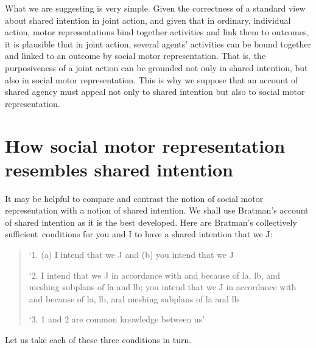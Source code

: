 \documentclass[12pt,\papersize]{extarticle}
\begin{document}


What we are suggesting is very simple.
Given the correctness of a standard view about shared intention in joint action, 
and 
given that in ordinary, individual action, motor representations  bind together activities and link them to outcomes,
it is plausible that 
in joint action, several agents' activities can be bound together and linked to an outcome by social motor representation.
That is,
the purposiveness of a joint action can be grounded not only in shared intention, but also in social motor representation.
This is why we suppose that an account of shared agency must appeal not only to shared intention but also to social motor representation.


\section{How social motor representation resembles shared intention}
It may be helpful to compare and contrast the notion of social motor representation with a notion of shared intention. 
We shall use Bratman's account of shared intention as it is the best developed. 
Here are Bratman’s collectively sufficient\footnotemark \ conditions for you and I to have a shared intention that we J:
%
%
\begin{quote}
\label{quote:bratman_account}
`1. (a) I intend that we J and (b) you intend that we J
 
`2. I intend that we J in accordance with and because of la, lb, and meshing subplans of la and lb; you intend that we J in accordance with and because of la, lb, and meshing subplans of la and lb
 
`3. 1 and 2 are common knowledge between us' \citep[][p.\ View 4]{Bratman:1993je}
\end{quote}
%
Let us take each of these three conditions in turn.
\end{document}
